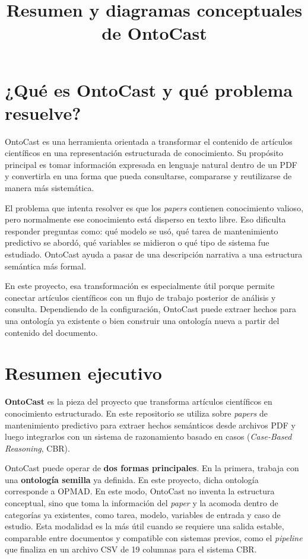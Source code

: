 \documentclass[12pt]{article}
\title{Resumen y diagramas conceptuales de OntoCast}
\author{}
\date{}
\begin{document}
\maketitle

\section{¿Qué es OntoCast y qué problema resuelve?}

OntoCast es una herramienta orientada a transformar el contenido de artículos científicos en una representación estructurada de conocimiento. Su propósito principal es tomar información expresada en lenguaje natural dentro de un PDF y convertirla en una forma que pueda consultarse, compararse y reutilizarse de manera más sistemática.

El problema que intenta resolver es que los \textit{papers} contienen conocimiento valioso, pero normalmente ese conocimiento está disperso en texto libre. Eso dificulta responder preguntas como: qué modelo se usó, qué tarea de mantenimiento predictivo se abordó, qué variables se midieron o qué tipo de sistema fue estudiado. OntoCast ayuda a pasar de una descripción narrativa a una estructura semántica más formal.

En este proyecto, esa transformación es especialmente útil porque permite conectar artículos científicos con un flujo de trabajo posterior de análisis y consulta. Dependiendo de la configuración, OntoCast puede extraer hechos para una ontología ya existente o bien construir una ontología nueva a partir del contenido del documento.

\section{Resumen ejecutivo}

\textbf{OntoCast} es la pieza del proyecto que transforma artículos científicos en conocimiento estructurado. En este repositorio se utiliza sobre \textit{papers} de mantenimiento predictivo para extraer hechos semánticos desde archivos PDF y luego integrarlos con un sistema de razonamiento basado en casos (\textit{Case-Based Reasoning}, CBR).

OntoCast puede operar de \textbf{dos formas principales}. En la primera, trabaja con una \textbf{ontología semilla} ya definida. En este proyecto, dicha ontología corresponde a OPMAD. En este modo, OntoCast no inventa la estructura conceptual, sino que toma la información del \textit{paper} y la acomoda dentro de categorías ya existentes, como tarea, modelo, variables de entrada y caso de estudio. Esta modalidad es la más útil cuando se requiere una salida estable, comparable entre documentos y compatible con sistemas previos, como el \textit{pipeline} que finaliza en un archivo CSV de 19 columnas para el sistema CBR.
\end{document}
